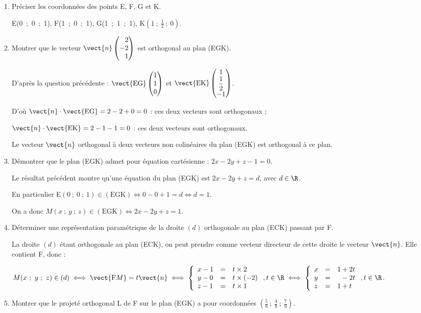 \begin{enumerate}
\item Préciser les coordonnées des points E, F{}, G et K.

E(0~;~0~;~1), \quad F(1~;~0~;~1), \quad G(1~;~1~;~1), \quad K$\left(1~;~\frac12~;~0\right)$.
\item Montrer que le vecteur $\vect{n}\begin{pmatrix}\phantom{-}2\\-2\\\phantom{-}1\end{pmatrix}$ est orthogonal au plan (EGK).

D'après la question précédente : $\vect{\text{EG}}\begin{pmatrix}1\\1\\0 \end{pmatrix}$ et $\vect{\text{EK}}\begin{pmatrix}1\\\dfrac12\\- 1 \end{pmatrix}$.

D'où $\vect{n} \cdot \vect{\text{EG}} = 2 - 2 + 0 = 0$ : ces deux vecteurs sont orthogonaux ;

$\vect{n} \cdot \vect{\text{EK}} = 2 - 1 - 1 = 0$ : ces deux vecteurs sont orthogonaux.

Le vecteur $\vect{n}$ orthogonal à deux vecteurs non colinéaires du plan (EGK) est orthogonal à ce plan.
\item Démontrer que le plan (EGK) admet pour équation cartésienne : $2x - 2y + z - 1 = 0.$

Le résultat précédent montre qu'une équation du plan (EGK) est $2x - 2y + z = d$, avec $d \in \R$.

En particulier E$(0~;~0~;~1) \in (\text{EGK}) \iff 0 - 0 + 1 = d \iff d = 1$.

On a donc $M(x~;~y~;~z) \in (\text{EGK}) \iff 2x - 2y + z = 1$.
\item Déterminer une représentation paramétrique de la droite $(d)$ orthogonale au plan (ECK)
passant par F{}.

La droite $(d)$ étant orthogonale au plan (ECK), on peut prendre comme vecteur directeur de cette droite le vecteur $\vect{n}$. Elle contient F, donc :

$M(x~;~y~;~z) \in (d) \iff \vect{\text{F}M} = t\vect{n} \iff \left\{\begin{array}{l c l}
x - 1&=&t \times 2\\
y - 0&=&t \times (- 2)\\
z - 1&=&t \times 1
\end{array}\right., t \in \R \iff 
\left\{\begin{array}{l c l}
x &=& 1 + 2t\\
y &=&\phantom{1}- 2t\\
z &=&1 + t
\end{array}\right., t \in \R$.
\item Montrer que le projeté orthogonal L de F sur le plan (EGK) a pour coordonnées $\left(\frac59~;~\frac49~;~\frac79\right)$.


\end{enumerate}
